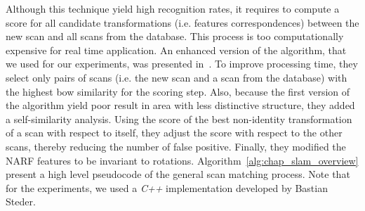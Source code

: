 Although this technique yield high recognition rates, it requires to compute a score for all candidate transformations (i.e. features correspondences) between the new scan and all scans from the database. This process is too computationally expensive for real time application. An enhanced version of the algorithm, that we used for our experiments, was presented in~\cite{Steder2011b}. To improve processing time, they select only pairs of scans (i.e. the new scan and a scan from the database) with the highest \gls*{bow} similarity for the scoring step. Also, because the first version of the algorithm yield poor result in area with less distinctive structure, they added a self-similarity analysis. Using the score of the best non-identity transformation of a scan with respect to itself, they adjust the score with respect to the other scans, thereby reducing the number of false positive. Finally, they modified the NARF features to be invariant to rotations. Algorithm~\ref{alg:chap_slam_overview} present a high level pseudocode of the general scan matching process. Note that for the experiments, we used a \textit{C++} implementation developed by Bastian Steder.

